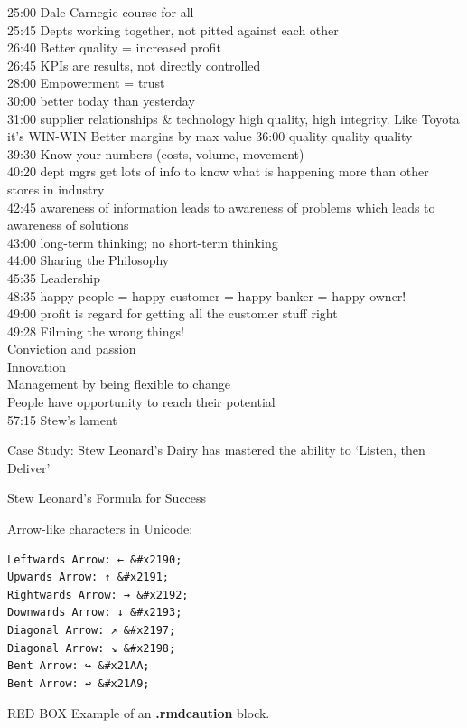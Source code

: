 \documentclass[
]{book}
\begin{document}
25:00 Dale Carnegie course for all\\
25:45 Depts working together, not pitted against each other\\
26:40 Better quality = increased profit\\
26:45 KPIs are results, not directly controlled\\
28:00 Empowerment = trust\\
30:00 better today than yesterday\\
31:00 supplier relationships \& technology high quality, high integrity. Like Toyota it's WIN-WIN Better margins by max value
36:00 quality quality quality\\
39:30 Know your numbers (costs, volume, movement)\\
40:20 dept mgrs get lots of info to know what is happening more than other stores in industry\\
42:45 awareness of information leads to awareness of problems which leads to awareness of solutions\\
43:00 long-term thinking; no short-term thinking\\
44:00 Sharing the Philosophy\\
45:35 Leadership\\
48:35 happy people = happy customer = happy banker = happy owner!\\
49:00 profit is regard for getting all the customer stuff right\\
49:28 Filming the wrong things!\\
Conviction and passion\\
Innovation\\
Management by being flexible to change\\
People have opportunity to reach their potential\\
57:15 Stew's lament

Case Study: Stew Leonard's Dairy has mastered the ability to `Listen, then Deliver'

Stew Leonard's Formula for Success

Arrow-like characters in Unicode:

\begin{verbatim}
Leftwards Arrow: ← &#x2190;
Upwards Arrow: ↑ &#x2191;
Rightwards Arrow: → &#x2192;
Downwards Arrow: ↓ &#x2193;
Diagonal Arrow: ↗ &#x2197;
Diagonal Arrow: ↘ &#x2198;
Bent Arrow: ↪ &#x21AA;
Bent Arrow: ↩ &#x21A9;
\end{verbatim}

RED BOX Example of an \textbf{.rmdcaution} block.
\end{document}
